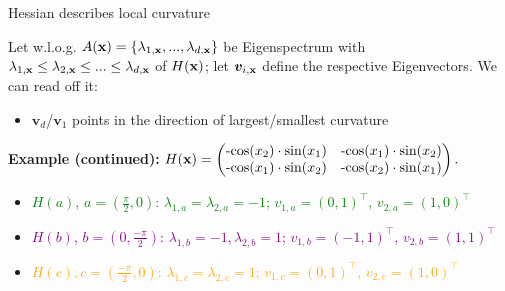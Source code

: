 \begin{vbframe}{Hessian describes local curvature} 

\begin{footnotesize}

Let w.l.o.g. $A(\mathbf{x}) = \{\lambda_{1, \mathbf{x}}, ..., \lambda_{d, \mathbf{x}}\}$ be Eigenspectrum with $\lambda_{1, \mathbf{x}} \le \lambda_{2, \mathbf{x}} \le ... \le \lambda_{d, \mathbf{x}}$ of $H(\mathbf{x})$; let $\bm{v}_{i, \mathbf{x}}$ define the respective Eigenvectors. We can read off it: 

\begin{itemize}
  \item $\bm{v}_d$/$\bm{v}_1$ points in the direction of largest/smallest curvature
\end{itemize}

\vspace*{0.1cm}



\textbf{Example (continued):} $H(\mathbf{x}) = \begin{pmatrix}
\text{-cos}(x_2)\cdot\text{sin}(x_1) & \text{-cos}(x_1)\cdot\text{sin}(x_2) 
\\ \text{-cos}(x_1)\cdot\text{sin}(x_2) & \text{-cos}(x_2)\cdot\text{sin}(x_1) 
\end{pmatrix}.
$

\begin{itemize}
  \item \textcolor{green}{$H(a)$, $a=(\frac{\pi}{2},0)$: $\lambda_{1,a} = \lambda_{2,a} = -1$; $v_{1,a} = (0, 1)^\top$, $v_{2,a} = (1, 0)^\top$}
  \item \textcolor{purple}{$H(b)$, $b=(0,\frac{-\pi}{2})$: $\lambda_{1,b} = -1, \lambda_{2,b} = 1$; $v_{1,b} = (-1, 1)^\top$, $v_{2,b} = (1, 1)^\top$}
  \item \textcolor{orange}{$H(c), c=(\frac{-\pi}{2},0)$: $\lambda_{1,c} = \lambda_{2,c} = 1$; $v_{1,c} = (0, 1)^\top$, $v_{2,c} = (1, 0)^\top$}
\end{itemize}

\end{footnotesize}

\vspace*{0.1cm}


\end{vbframe}
